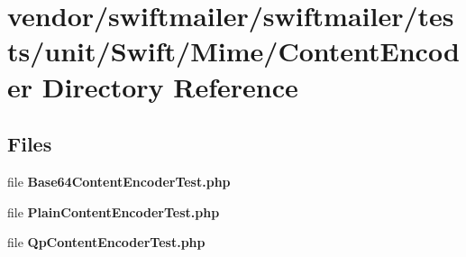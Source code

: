 \section{vendor/swiftmailer/swiftmailer/tests/unit/\+Swift/\+Mime/\+Content\+Encoder Directory Reference}
\label{dir_0f764aa897b3eb0014002dc3971fb7a2}
\subsection*{Files}
\begin{DoxyCompactItemize}
\item 
file {\bf Base64\+Content\+Encoder\+Test.\+php}
\item 
file {\bf Plain\+Content\+Encoder\+Test.\+php}
\item 
file {\bf Qp\+Content\+Encoder\+Test.\+php}
\end{DoxyCompactItemize}
